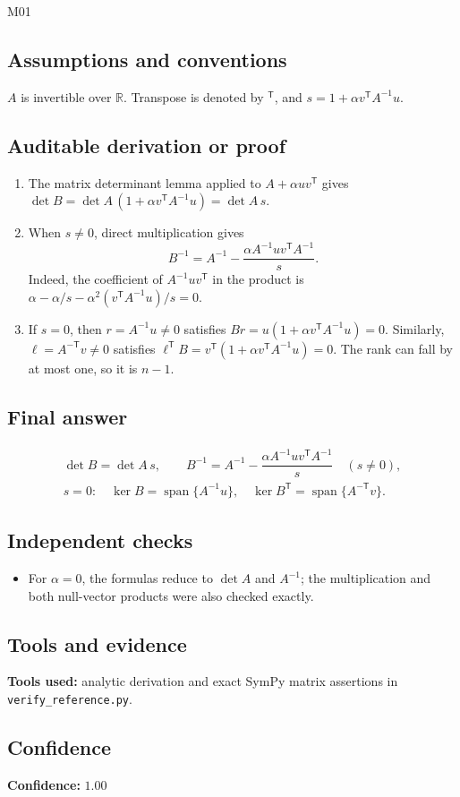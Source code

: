 \documentclass[11pt]{article}
\newcommand{\R}{\mathbb{R}}
\begin{document}
\begin{mprsolution}{M01}
\subsection*{Assumptions and conventions}
\(A\) is invertible over \(\R\).  Transpose is denoted by \(^{\mathsf T}\), and
\(s=1+\alpha v^{\mathsf T}A^{-1}u\).
\subsection*{Auditable derivation or proof}
\begin{enumerate}[label=\textbf{Step \arabic*:},leftmargin=*]
\item The matrix determinant lemma applied to \(A+\alpha uv^{\mathsf T}\) gives
\(\det B=\det A\,(1+\alpha v^{\mathsf T}A^{-1}u)=\det A\,s\).
\item When \(s\ne0\), direct multiplication gives
\[
B^{-1}=A^{-1}-\frac{\alpha A^{-1}uv^{\mathsf T}A^{-1}}{s}.
\]
Indeed, the coefficient of \(A^{-1}uv^{\mathsf T}\) in the product is
\(\alpha-\alpha/s-\alpha^2(v^{\mathsf T}A^{-1}u)/s=0\).
\item If \(s=0\), then \(r=A^{-1}u\ne0\) satisfies
\(Br=u(1+\alpha v^{\mathsf T}A^{-1}u)=0\).
Similarly, \(\ell=A^{-\mathsf T}v\ne0\) satisfies
\(\ell^{\mathsf T}B=v^{\mathsf T}(1+\alpha v^{\mathsf T}A^{-1}u)=0\).
The rank can fall by at most one, so it is \(n-1\).
\end{enumerate}
\subsection*{Final answer}
\[
\boxed{\begin{gathered}
\det B=\det A\,s,\qquad
B^{-1}=A^{-1}-\dfrac{\alpha A^{-1}uv^{\mathsf T}A^{-1}}{s}\quad(s\ne0),\\
s=0:\quad \ker B=\operatorname{span}\{A^{-1}u\},\quad
\ker B^{\mathsf T}=\operatorname{span}\{A^{-\mathsf T}v\}.
\end{gathered}}
\]
\subsection*{Independent checks}
\begin{itemize}[leftmargin=*]
\item For \(\alpha=0\), the formulas reduce to \(\det A\) and \(A^{-1}\);
the multiplication and both null-vector products were also checked exactly.
\end{itemize}
\subsection*{Tools and evidence}
\textbf{Tools used:} analytic derivation and exact SymPy matrix assertions in
\texttt{verify\_reference.py}.
\subsection*{Confidence}
\textbf{Confidence:} \(1.00\)
\end{mprsolution}
\end{document}
